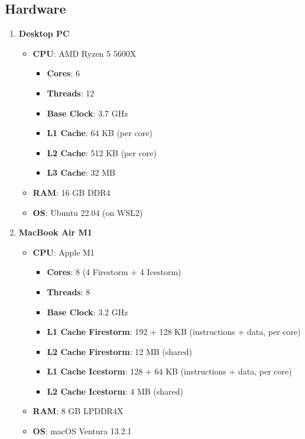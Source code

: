 \documentclass{article}
\begin{document}
\subsection{Hardware}
\begin{enumerate}
    \item \textbf{Desktop PC}
    \begin{itemize}
        \item \textbf{CPU}: AMD Ryzen 5 5600X
        \begin{itemize}
            \item \textbf{Cores}: 6
            \item \textbf{Threads}: 12
            \item \textbf{Base Clock}: 3.7 GHz
            \item \textbf{L1 Cache}: 64 KB (per core)
            \item \textbf{L2 Cache}: 512 KB (per core)
            \item \textbf{L3 Cache}: 32 MB
        \end{itemize}
        \item \textbf{RAM}: 16 GB DDR4
        \item \textbf{OS}: Ubuntu 22.04 (on WSL2)
    \end{itemize}
    \item \textbf{MacBook Air M1}
    \begin{itemize}
        \item \textbf{CPU}: Apple M1
        \begin{itemize}
            \item \textbf{Cores}: 8 (4 Firestorm + 4 Icestorm)
            \item \textbf{Threads}: 8
            \item \textbf{Base Clock}: 3.2 GHz
            \item \textbf{L1 Cache Firestorm}: 192 + 128 KB (instructions + data, per core)
            \item \textbf{L2 Cache Firestorm}: 12 MB (shared)
            \item \textbf{L1 Cache Icestorm}: 128 + 64 KB (instructions + data, per core)
            \item \textbf{L2 Cache Icestorm}: 4 MB (shared)
        \end{itemize}
        \item \textbf{RAM}: 8 GB LPDDR4X
        \item \textbf{OS}: macOS Ventura 13.2.1
    \end{itemize}
\end{enumerate}
\end{document}
